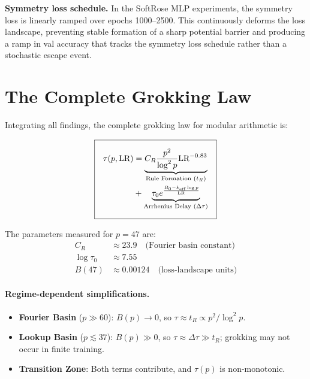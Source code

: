 \documentclass[11pt,twocolumn]{article}
\begin{document}
\textbf{Symmetry loss schedule.} In the SoftRose MLP experiments, the symmetry loss is linearly ramped over epochs 1000--2500. This continuously deforms the loss landscape, preventing stable formation of a sharp potential barrier and producing a ramp in val accuracy that tracks the symmetry loss schedule rather than a stochastic escape event.

\section{The Complete Grokking Law}
\label{sec:law}

Integrating all findings, the complete grokking law for modular arithmetic is:

\begin{equation}
\setlength{\fboxsep}{10pt}
\boxed{
\begin{aligned}
\tau(p, \text{LR}) &= \underbrace{C_R \frac{p^2}{\log^2 p} \text{LR}^{-0.83}}_{\text{Rule Formation }(t_R)} \\ 
&+ \underbrace{\tau_0 e^{\frac{B_0 - k_{\text{eff}}\log p}{\text{LR}}}}_{\text{Arrhenius Delay }(\Delta\tau)}
\end{aligned}
}
\label{eq:full_law}
\end{equation}

The parameters measured for $p=47$ are:
\begin{align}
C_R &\approx 23.9 \quad \text{(Fourier basin constant)} \nonumber\\
\log \tau_0 &\approx 7.55 \nonumber\\
B(47) &\approx 0.00124 \quad \text{(loss-landscape units)} \nonumber
\end{align}

\paragraph{Regime-dependent simplifications.}
\begin{itemize}[itemsep=1pt]
\item \textbf{Fourier Basin} ($p \gg 60$): $B(p) \to 0$, so $\tau \approx t_R \propto p^2/\log^2 p$.
\item \textbf{Lookup Basin} ($p \lesssim 37$): $B(p) \gg 0$, so $\tau \approx \Delta\tau \gg t_R$; grokking may not occur in finite training.
\item \textbf{Transition Zone}: Both terms contribute, and $\tau(p)$ is non-monotonic.
\end{itemize}
\end{document}
